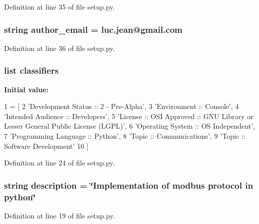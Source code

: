 Definition at line 35 of file setup.\+py.

\subsubsection[{author\+\_\+email}]{\setlength{\rightskip}{0pt plus 5cm}string author\+\_\+email = \textquotesingle{}luc.\+jean@gmail.\+com\textquotesingle{}}\label{namespacesetup_a9b3c5cceb9178d1968dd26e6f147265d}


Definition at line 36 of file setup.\+py.

\subsubsection[{classifiers}]{\setlength{\rightskip}{0pt plus 5cm}list classifiers}\label{namespacesetup_a501bfc1867c9d0b5d91873982919a191}
{\bfseries Initial value\+:}
\begin{DoxyCode}
1 = [
2         \textcolor{stringliteral}{'Development Status :: 2 - Pre-Alpha'},
3         \textcolor{stringliteral}{'Environment :: Console'},
4         \textcolor{stringliteral}{'Intended Audience :: Developers'},
5         \textcolor{stringliteral}{'License :: OSI Approved :: GNU Library or Lesser General Public License (LGPL)'},
6         \textcolor{stringliteral}{'Operating System :: OS Independent'},
7         \textcolor{stringliteral}{'Programming Language :: Python'},
8         \textcolor{stringliteral}{'Topic :: Communications'},
9         \textcolor{stringliteral}{'Topic :: Software Development'}
10     ]
\end{DoxyCode}


Definition at line 24 of file setup.\+py.

\subsubsection[{description}]{\setlength{\rightskip}{0pt plus 5cm}string description = \char`\"{}Implementation of modbus protocol in python\char`\"{}}\label{namespacesetup_a23af17c78302b71c14ef38ea40b8d1d7}


Definition at line 19 of file setup.\+py.

